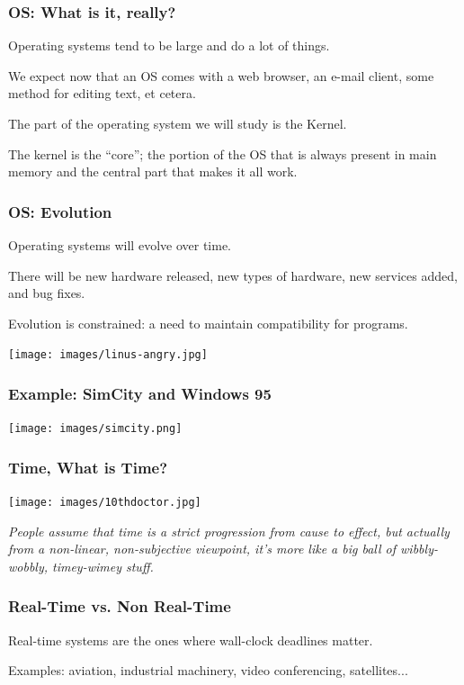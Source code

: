 \begin{frame}
\frametitle{OS: What is it, really?}

Operating systems tend to be large and do a lot of things. 

We expect now that an OS comes with a web browser, an e-mail client, some method for editing text, et cetera. 

The part of the operating system we will study is the \alert{Kernel}.

The kernel is the ``core''; the portion of the OS that is always present in main memory and the central part that makes it all work.

\end{frame}

\begin{frame}
\frametitle{OS: Evolution}
Operating systems will evolve over time. 

There will be new hardware released, new types of hardware, new services added, and bug fixes. 

Evolution is constrained: a need to maintain compatibility for programs. 

\begin{center}
	\texttt{[image: images/linus-angry.jpg]}
\end{center}

\end{frame}


\begin{frame}
\frametitle{Example: SimCity and Windows 95}

\begin{center}
	\texttt{[image: images/simcity.png]}
\end{center}

\end{frame}


\begin{frame}
\frametitle{Time, What is Time?}

\begin{center}
	\texttt{[image: images/10thdoctor.jpg]}
\end{center}

\textit{People assume that time is a strict progression from cause to effect, but actually from a non-linear, non-subjective viewpoint, it's more like a big ball of wibbly-wobbly, timey-wimey stuff.}


\end{frame}



\begin{frame}
\frametitle{Real-Time vs. Non Real-Time}

Real-time systems are the ones where wall-clock deadlines matter.

Examples: aviation, industrial machinery, video conferencing, satellites...

\end{frame}

